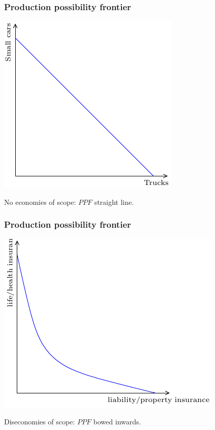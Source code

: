 \documentclass[xcolor=pdftex,dvipsnames]{beamer}
\begin{document}
\begin{frame}
\frametitle{Production possibility frontier}
\begin{center}
\includegraphics{pics/PPF3}
\end{center}



No economies of scope: $PPF$ straight line. 
\end{frame}


\begin{frame}
\frametitle{Production possibility frontier}
\begin{center}
\includegraphics{pics/PPF4}
\end{center}



Diseconomies of scope: $PPF$ bowed inwards. 
\end{frame}
\end{document}
